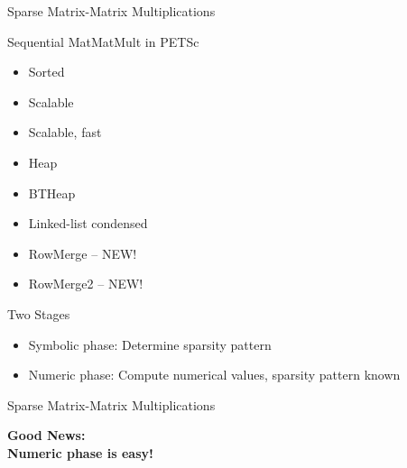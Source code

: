 


\begin{frame}{Sparse Matrix-Matrix Multiplications}

 \begin{block}{Sequential MatMatMult in PETSc}
  \begin{itemize}
   \item Sorted
   \item Scalable
   \item Scalable, fast
   \item Heap
   \item BTHeap
   \item Linked-list condensed
   \item RowMerge -- {\color{red}NEW!}
   \item RowMerge2 -- {\color{red}NEW!}
  \end{itemize}
 \end{block}

 \pause
 \begin{block}{Two Stages}
  \begin{itemize}
   \item Symbolic phase: Determine sparsity pattern
   \item Numeric phase: Compute numerical values, sparsity pattern known
  \end{itemize}
 \end{block}

\end{frame}




\begin{frame}{Sparse Matrix-Matrix Multiplications}

 \begin{center}\Large \textbf{Good News:} \\[2em] %
                      \textbf{Numeric phase is easy!}\end{center}

\end{frame}


